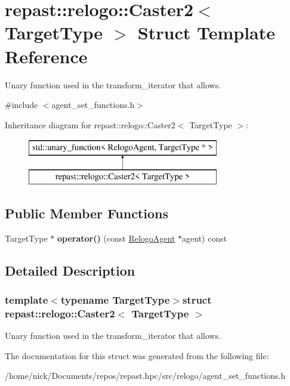 \hypertarget{structrepast_1_1relogo_1_1_caster2}{\section{repast\-:\-:relogo\-:\-:Caster2$<$ Target\-Type $>$ Struct Template Reference}
\label{structrepast_1_1relogo_1_1_caster2}
}


Unary function used in the transform\-\_\-iterator that allows.  




{\ttfamily \#include $<$agent\-\_\-set\-\_\-functions.\-h$>$}

Inheritance diagram for repast\-:\-:relogo\-:\-:Caster2$<$ Target\-Type $>$\-:\begin{figure}[H]
\begin{center}
\leavevmode
\includegraphics[height=2.000000cm]{structrepast_1_1relogo_1_1_caster2}
\end{center}
\end{figure}
\subsection*{Public Member Functions}
\begin{DoxyCompactItemize}
\item 
\hypertarget{structrepast_1_1relogo_1_1_caster2_ae50fa843df761aaba14938ce189ad995}{Target\-Type $\ast$ {\bfseries operator()} (const \hyperlink{classrepast_1_1relogo_1_1_relogo_agent}{Relogo\-Agent} $\ast$agent) const }\label{structrepast_1_1relogo_1_1_caster2_ae50fa843df761aaba14938ce189ad995}

\end{DoxyCompactItemize}


\subsection{Detailed Description}
\subsubsection*{template$<$typename Target\-Type$>$struct repast\-::relogo\-::\-Caster2$<$ Target\-Type $>$}

Unary function used in the transform\-\_\-iterator that allows. 

The documentation for this struct was generated from the following file\-:\begin{DoxyCompactItemize}
\item 
/home/nick/\-Documents/repos/repast.\-hpc/src/relogo/agent\-\_\-set\-\_\-functions.\-h\end{DoxyCompactItemize}
